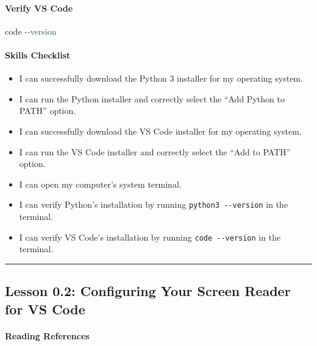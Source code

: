 \documentclass[
  justified,
  openright,
]{tufte-book}
\let\subsubsection\paragraph
\let\paragraph\paragraph
\newcommand{\AttributeTok}[1]{\textcolor{DarkSlateGray}{#1}}
\newcommand{\ExtensionTok}[1]{#1}
\newenvironment{Shaded}{%
  \begin{snugshade}
}{%
  \end{snugshade}
}
\let\subsubsection\paragraph
\let\paragraph\paragraph
\providecommand{\tightlist}{%
  \setlength{\itemsep}{0pt}\setlength{\parskip}{0pt}}
\begin{document}
\subsubsection{Verify VS Code}\label{verify-vs-code}

\begin{Shaded}
\begin{Highlighting}[]
\ExtensionTok{code} \AttributeTok{{-}{-}version}
\end{Highlighting}
\end{Shaded}

\subsubsection{Skills Checklist}\label{skills-checklist}

\begin{itemize}
\tightlist
\item[$\square$]
  I can successfully download the Python 3 installer for my operating
  system.
\item[$\square$]
  I can run the Python installer and correctly select the ``Add Python
  to PATH'' option.
\item[$\square$]
  I can successfully download the VS Code installer for my operating
  system.
\item[$\square$]
  I can run the VS Code installer and correctly select the ``Add to
  PATH'' option.
\item[$\square$]
  I can open my computer's system terminal.
\item[$\square$]
  I can verify Python's installation by running
  \texttt{python3\ -\/-version} in the terminal.
\item[$\square$]
  I can verify VS Code's installation by running
  \texttt{code\ -\/-version} in the terminal.
\end{itemize}

\begin{center}\rule{0.5\linewidth}{0.5pt}\end{center}

\subsection{Lesson 0.2: Configuring Your Screen Reader for VS
Code}\label{lesson-0.2-configuring-your-screen-reader-for-vs-code-1}

\subsubsection{Reading References}\label{reading-references-1}
\end{document}
